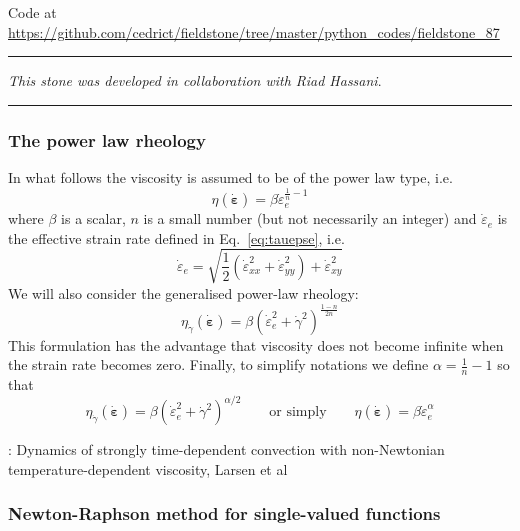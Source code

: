 

\begin{center}
Code at \url{https://github.com/cedrict/fieldstone/tree/master/python_codes/fieldstone_87}
\end{center}

\par\noindent\rule{\textwidth}{0.4pt}

{\sl This stone was developed in collaboration with Riad Hassani}. 

\par\noindent\rule{\textwidth}{0.4pt}

\subsubsection*{The power law rheology}

In what follows the viscosity 
is assumed to be of the power law type, i.e.
\[
\eta(\dot{\bm \varepsilon}) = \beta  \dot{\varepsilon}_e^{\frac1n-1}
\]
where $\beta$ is a scalar, $n$ is a small number (but not 
necessarily an integer) and
$\dot{\varepsilon}_e$ is the effective strain rate defined in Eq.~\eqref{eq:tauepse},
i.e.
\[
\dot\varepsilon_e = \sqrt{ \frac{1}{2}(\dot\varepsilon_{xx}^2 + \dot\varepsilon_{yy}^2 ) 
+ \dot\varepsilon_{xy}^2}
\]
We will also consider the generalised power-law rheology:
\[
\eta_{\dot\gamma}(\dot{\bm \varepsilon})  = \beta  ( \dot{\varepsilon}_e^2 + \dot\gamma^2)^{\frac{1-n}{2n}}
\]
This formulation has the advantage that viscosity does not become infinite 
when the strain rate becomes zero.
Finally, to simplify notations we define $\alpha=\frac1n-1$ so that 
\[
\boxed{
\eta_{\dot\gamma}(\dot{\bm \varepsilon})  = \beta  ( \dot{\varepsilon}_e^2 + \dot\gamma^2)^{\alpha/2}
}
\qquad
\text{or simply}
\qquad
\boxed{
\eta(\dot{\bm \varepsilon})  = \beta  \dot{\varepsilon}_e^\alpha
}
\]


\Literature: Dynamics of strongly time-dependent convection
with non-Newtonian temperature-dependent viscosity, Larsen et al \cite{laym96}

 

\subsubsection*{Newton-Raphson method for single-valued functions}

